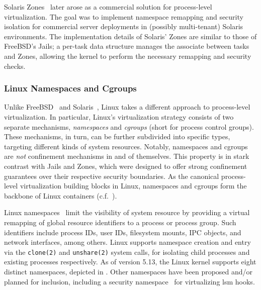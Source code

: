 Solaris Zones~\cite{price2004_zones} later arose as a commercial solution for
process-level virtualization. The goal was to implement namespace remapping and security
isolation for commercial server deployments in (possibly multi-tenant) Solaris
environments. The implementation details of Solaris' Zones are similar to those of
FreeBSD's Jails; a per-task data structure manages the associate between tasks and Zones,
allowing the kernel to perform the necessary remapping and security checks.

\subsubsection*{Linux Namespaces and Cgroups}

Unlike FreeBSD~\cite{kamp2000_jails} and Solaris~\cite{price2004_zones}, Linux takes
a different approach to process-level virtualization. In particular, Linux's
virtualization strategy consists of two separate mechanisms, \textit{namespaces} and
\textit{cgroups} (short for process control groups). These mechanisms, in turn, can be
further subdivided into specific types, targeting different kinds of system resources.
Notably, namespaces and cgroups are \textit{not} confinement mechanisms in and of
themselves. This property is in stark contrast with Jails and Zones, which were designed
to offer strong confinement guarantees over their respective security boundaries.
As the canonical process-level virtualization building blocks in Linux, namespaces and
cgroups form the backbone of Linux containers (c.f.~).

Linux namespaces~\cite{biederman2006_namespaces, linux_namespaces} limit the visibility of
system resource by providing a virtual remapping of global resource identifiers to
a process or process group. Such identifiers include process IDs, user IDs, filesystem
mounts, IPC objects, and network interfaces, among others. Linux supports namespace
creation and entry via the \texttt{clone(2)} and \texttt{unshare(2)} system calls, for
isolating child processes and existing processes respectively. As of version 5.13, the
Linux kernel supports eight distinct namespaces, depicted in . Other
namespaces have been proposed and/or planned for inclusion, including a security
namespace~\cite{sun2018_security_namespace} for virtualizing \gls{lsm} hooks.

